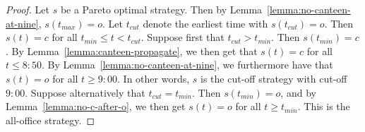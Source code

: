 \documentclass[twocolumn,a4paper,superscriptaddress,nofootinbib]{revtex4}
\begin{document}
\begin{proof}
Let $s$ be a Pareto optimal strategy. Then by Lemma~\ref{lemma:no-canteen-at-nine}, $s(t_{max}) = o$. Let $t_{cut}$ denote the earliest time with $s(t_{cut}) = o$. Then $s(t) =c$ for all $t_{min} \leq t < t_{cut}$. Suppose first that $t_{cut} > t_{min}$. Then $s(t_{min}) = c$. By Lemma~\ref{lemma:canteen-propagate}, we then get that $s(t) = c$ for all $t \leq 8{:}50$. By Lemma~\ref{lemma:no-canteen-at-nine}, we furthermore have that $s(t) = o$ for all $t \geq 9{:}00$. In other words, $s$ is the cut-off strategy with cut-off $9{:}00$.  Suppose alternatively that $t_{cut} = t_{min}$. Then $s(t_{min})=o$, and by  Lemma~\ref{lemma:no-c-after-o}, we then get $s(t) = o$ for all $t \geq t_{min}$. This is the all-office strategy. 

\end{proof}
\end{document}
